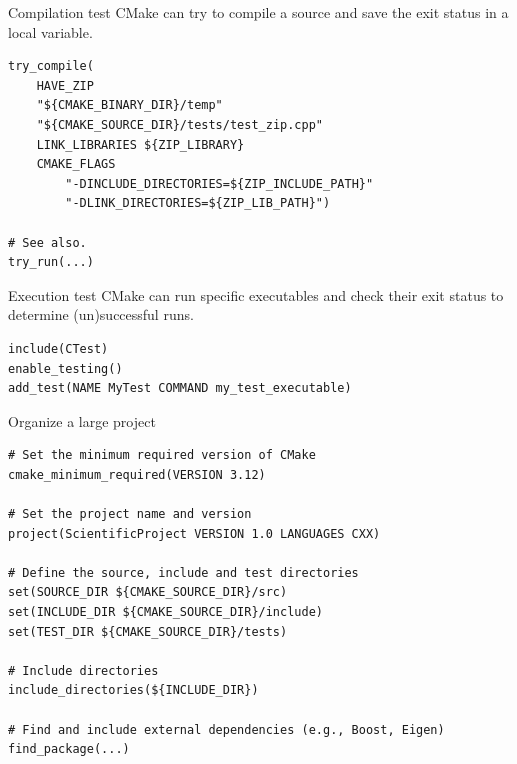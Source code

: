 \documentclass[aspectratio=169,11pt]{beamer}
\begin{document}
\begin{frame}[fragile]{Compilation test}
CMake can try to compile a source and save the exit status in a local variable.
\begin{verbatim}
try_compile(
    HAVE_ZIP
    "${CMAKE_BINARY_DIR}/temp"
    "${CMAKE_SOURCE_DIR}/tests/test_zip.cpp"
    LINK_LIBRARIES ${ZIP_LIBRARY}
    CMAKE_FLAGS
        "-DINCLUDE_DIRECTORIES=${ZIP_INCLUDE_PATH}"
        "-DLINK_DIRECTORIES=${ZIP_LIB_PATH}")

# See also.
try_run(...)
\end{verbatim}
\end{frame}

\begin{frame}[fragile]{Execution test}
CMake can run specific executables and check their exit status to determine (un)successful runs.
\begin{verbatim}
include(CTest)
enable_testing()
add_test(NAME MyTest COMMAND my_test_executable)
\end{verbatim}
\end{frame}

\begin{frame}[fragile]{Organize a large project}
\begin{verbatim}
# Set the minimum required version of CMake
cmake_minimum_required(VERSION 3.12)

# Set the project name and version
project(ScientificProject VERSION 1.0 LANGUAGES CXX)

# Define the source, include and test directories
set(SOURCE_DIR ${CMAKE_SOURCE_DIR}/src)
set(INCLUDE_DIR ${CMAKE_SOURCE_DIR}/include)
set(TEST_DIR ${CMAKE_SOURCE_DIR}/tests)

# Include directories
include_directories(${INCLUDE_DIR})

# Find and include external dependencies (e.g., Boost, Eigen)
find_package(...)
\end{verbatim}
\end{frame}
\end{document}
